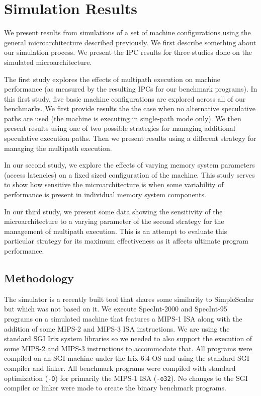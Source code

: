 \documentclass[10pt,dvips]{article}
\begin{document}
\section{Simulation Results}
%
We present results from simulations of a set of machine configurations
using the general microarchitecture described previously.
We first describe something about our simulation process.
We present the IPC results for three studies done on the simulated
microarchitecture.

The first study explores the effects of multipath execution
on machine performance (as measured by the resulting IPCs
for our benchmark programs).  In this first study, five
basic machine configurations are explored across all of our
benchmarks.  We first
provide results the the case when no alternative speculative paths are used
(the machine is executing in single-path mode only).
We then present results using one of two possible
strategies for managing additional speculative execution paths.
Then we present results using a different strategy for managing
the multipath execution.

In our second study, we explore the effects of varying
memory system parameters (access latencies) on a fixed sized configuration
of the machine.
This study serves to show how sensitive the microarchitecture
is when some variability of performance is present in individual
memory system components.

In our third study, we present some data showing
the sensitivity of the microarchitecture to a varying parameter
of the second strategy for
the management of multipath execution.
This is an attempt to evaluate this particular strategy for its maximum
effectiveness as it affects ultimate program performance.
%
\subsection{Methodology}
%
The simulator is a recently built tool that shares some similarity
to SimpleScalar \cite{Austin97} but which was not based on it.
We execute
SpecInt-2000 and SpecInt-95 programs on a simulated machine
that features a MIPS-1 ISA along with the addition of some MIPS-2 and
MIPS-3 ISA instructions.  We are using the standard SGI Irix system
libraries so we needed to also support the execution of some
MIPS-2 and MIPS-3 instructions to accommodate
that.  All programs were compiled on an SGI machine under the
Irix 6.4 OS and using the standard SGI compiler and linker.  
All benchmark programs were compiled with
standard optimization ({\tt -O}) for primarily the MIPS-1 ISA ({\tt -o32}).
No changes to the SGI compiler or linker were made to create
the binary benchmark programs.
\end{document}
